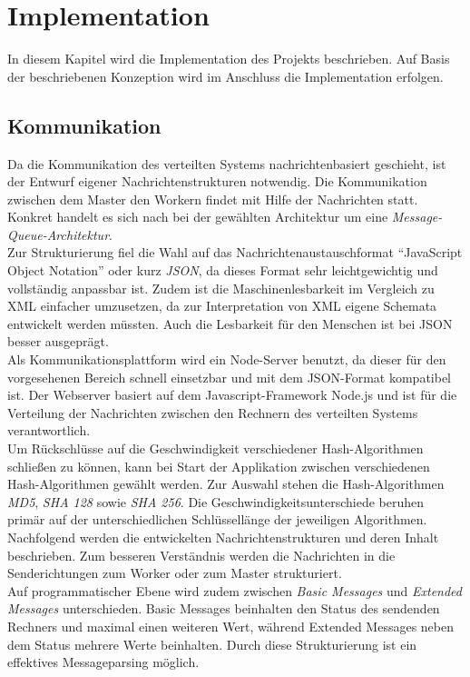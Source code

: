 \chapter{Implementation}
\label{implementation}
In diesem Kapitel wird die Implementation des Projekts beschrieben. Auf Basis der beschriebenen Konzeption wird im Anschluss die Implementation erfolgen. 
\section{Kommunikation}
Da die Kommunikation des verteilten Systems nachrichtenbasiert geschieht, ist der Entwurf eigener Nachrichtenstrukturen notwendig. Die Kommunikation zwischen dem Master den Workern findet mit Hilfe der Nachrichten statt. Konkret handelt es sich nach \citep{tanenbaum} bei der gewählten Architektur um eine \emph{Message-Queue-Architektur}. \\
Zur Strukturierung fiel die Wahl auf das Nachrichtenaustauschformat \enquote{JavaScript Object Notation} oder kurz \emph{JSON}, da dieses Format sehr leichtgewichtig und vollständig anpassbar ist. Zudem ist die Maschinenlesbarkeit im Vergleich zu XML einfacher umzusetzen, da zur Interpretation von XML eigene Schemata entwickelt werden müssten. Auch die Lesbarkeit für den Menschen ist bei JSON besser ausgeprägt.\\
Als Kommunikationsplattform wird ein Node-Server benutzt, da dieser für den vorgesehenen Bereich schnell einsetzbar und mit dem JSON-Format kompatibel ist. Der Webserver basiert auf dem Javascript-Framework Node.js und ist für die Verteilung der Nachrichten zwischen den Rechnern des verteilten Systems verantwortlich. \\

Um Rückschlüsse auf die Geschwindigkeit verschiedener Hash-Algorithmen schließen zu können, kann bei Start der Applikation zwischen verschiedenen Hash-Algorithmen gewählt werden. Zur Auswahl stehen die Hash-Algorithmen \emph{MD5}, \emph{SHA 128} sowie \emph{SHA 256}. Die Geschwindigkeitsunterschiede beruhen primär auf der unterschiedlichen Schlüssellänge der jeweiligen Algorithmen.\\


Nachfolgend werden die entwickelten Nachrichtenstrukturen und deren Inhalt beschrieben. Zum besseren Verständnis werden die Nachrichten in die Senderichtungen zum Worker oder zum Master strukturiert. \\
Auf programmatischer Ebene wird zudem zwischen \emph{Basic Messages} und \emph{Extended Messages} unterschieden. Basic Messages beinhalten den Status des sendenden Rechners und maximal einen weiteren Wert, während Extended Messages neben dem Status mehrere Werte beinhalten. Durch diese Strukturierung ist ein effektives Messageparsing möglich. 

